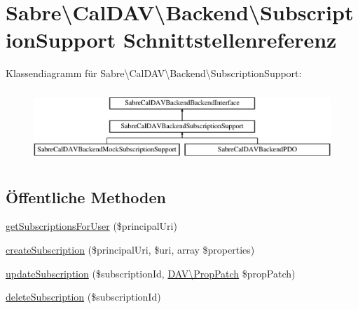 \hypertarget{interface_sabre_1_1_cal_d_a_v_1_1_backend_1_1_subscription_support}{}\section{Sabre\textbackslash{}Cal\+D\+AV\textbackslash{}Backend\textbackslash{}Subscription\+Support Schnittstellenreferenz}
\label{interface_sabre_1_1_cal_d_a_v_1_1_backend_1_1_subscription_support}
Klassendiagramm für Sabre\textbackslash{}Cal\+D\+AV\textbackslash{}Backend\textbackslash{}Subscription\+Support\+:\begin{figure}[H]
\begin{center}
\leavevmode
\includegraphics[height=2.745098cm]{interface_sabre_1_1_cal_d_a_v_1_1_backend_1_1_subscription_support}
\end{center}
\end{figure}
\subsection*{Öffentliche Methoden}
\begin{DoxyCompactItemize}
\item 
\mbox{\hyperlink{interface_sabre_1_1_cal_d_a_v_1_1_backend_1_1_subscription_support_ae57d04c00b532488fe930f2119b4eb5c}{get\+Subscriptions\+For\+User}} (\$principal\+Uri)
\item 
\mbox{\hyperlink{interface_sabre_1_1_cal_d_a_v_1_1_backend_1_1_subscription_support_a7dec0655bb91ca14f58aa4f5db4242f7}{create\+Subscription}} (\$principal\+Uri, \$uri, array \$properties)
\item 
\mbox{\hyperlink{interface_sabre_1_1_cal_d_a_v_1_1_backend_1_1_subscription_support_a20f5a3472fb23eca7bde970c959dee66}{update\+Subscription}} (\$subscription\+Id, \mbox{\hyperlink{class_sabre_1_1_d_a_v_1_1_prop_patch}{D\+A\+V\textbackslash{}\+Prop\+Patch}} \$prop\+Patch)
\item 
\mbox{\hyperlink{interface_sabre_1_1_cal_d_a_v_1_1_backend_1_1_subscription_support_adaaf00fe6295b0809c84e9b78cdae5e3}{delete\+Subscription}} (\$subscription\+Id)
\end{DoxyCompactItemize}


